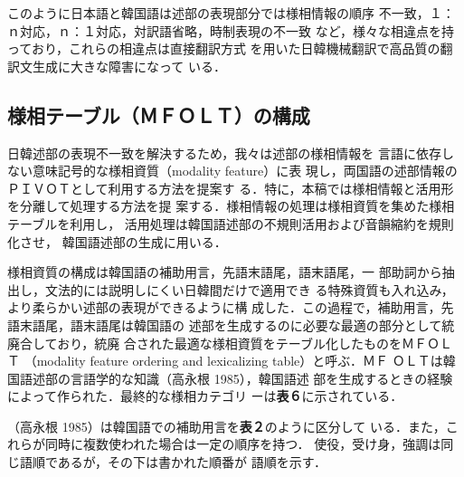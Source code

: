 このように日本語と韓国語は述部の表現部分では様相情報の順序
不一致，１：ｎ対応，ｎ：１対応，対訳語省略，時制表現の不一致
など，様々な相違点を持っており，これらの相違点は直接翻訳方式
を用いた日韓機械翻訳で高品質の翻訳文生成に大きな障害になって
いる．

\vspace{-1mm}
\subsection{様相テーブル（ＭＦＯＬＴ）の構成}
日韓述部の表現不一致を解決するため，我々は述部の様相情報を
言語に依存しない意味記号的な様相資質（modality feature）に表
現し，両国語の述部情報のＰＩＶＯＴとして利用する方法を提案す
る．特に，本稿では様相情報と活用形を分離して処理する方法を提
案する．様相情報の処理は様相資質を集めた様相テーブルを利用し，
活用処理は韓国語述部の不規則活用および音韻縮約を規則化させ，
韓国語述部の生成に用いる．

様相資質の構成は韓国語の補助用言，先語末語尾，語末語尾，一
部助詞から抽出し，文法的には説明しにくい日韓間だけで適用でき
る特殊資質も入れ込み，より柔らかい述部の表現ができるように構
成した．この過程で，補助用言，先語末語尾，語末語尾は韓国語の
述部を生成するのに必要な最適の部分として統廃合しており，統廃
合された最適な様相資質をテーブル化したものをＭＦＯＬＴ
（modality feature ordering and lexicalizing table）と呼ぶ．ＭＦ
ＯＬＴは韓国語述部の言語学的な知識（高永根 1985），韓国語述
部を生成するときの経験によって作られた．最終的な様相カテゴリ
ーは{\bf 表６}に示されている．

（高永根 1985）は韓国語での補助用言を{\bf 表２}のように区分して
いる．また，これらが同時に複数使われた場合は一定の順序を持つ．
使役，受け身，強調は同じ語順であるが，その下は書かれた順番が
語順を示す．

